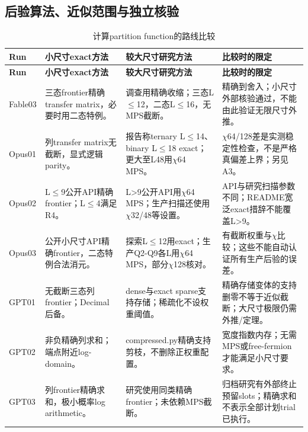 \documentclass[11pt,a4paper]{article}
\begin{document}
\subsection{后验算法、近似范围与独立核验}
{\fontsize{9.0}{12.6}\selectfont
\setlength{\tabcolsep}{2.5pt}
\begin{longtable}{>{\raggedright\arraybackslash}p{}>{\raggedright\arraybackslash}p{}>{\raggedright\arraybackslash}p{}>{\raggedright\arraybackslash}p{}}
\caption{计算partition function的路线比较}\\
\toprule
\textbf{Run} & \textbf{小尺寸exact方法} & \textbf{较大尺寸研究方法} & \textbf{比较时的限定}\tabularnewline
\midrule
\endfirsthead
\toprule
\textbf{Run} & \textbf{小尺寸exact方法} & \textbf{较大尺寸研究方法} & \textbf{比较时的限定}\tabularnewline
\midrule
\endhead
{}Fable03 & 三态frontier精确transfer matrix，必要时用二态特例。 & 调查用精确收缩；三态L\ensuremath{\leq}12，二态L\ensuremath{\leq}16，无MPS截断。 & 精确到舍入；小尺寸外部核验通过，不能由此验证无限尺寸外推。\tabularnewline
{}Opus01 & 列transfer matrix无截断，显式逻辑parity。 & 报告称ternary L\ensuremath{\leq}14、binary L\ensuremath{\leq}18 exact；更大至L48用\ensuremath{\chi}64 MPS。 & \ensuremath{\chi}64/128差是实测稳定性检查，不是严格真偏差上界；另见A3。\tabularnewline
{}Opus02 & L\ensuremath{\leq}9公开API精确frontier；L\ensuremath{\leq}4满足R4。 & L>9公开API用\ensuremath{\chi}64 MPS；生产扫描还使用\ensuremath{\chi}32/48等设置。 & API与研究扫描参数不同；README宽泛exact措辞不能覆盖L>9。\tabularnewline
{}Opus03 & 公开小尺寸API精确frontier，二态特例合法消元。 & 探索L\ensuremath{\leq}12用exact；生产Q2-Q9各L用\ensuremath{\chi}64 MPS，部分\ensuremath{\chi}128核对。 & 有截断权重与\ensuremath{\chi}比较；这些不能自动认证所有生产后验的误差。\tabularnewline
{}GPT01 & 无截断三态列frontier；Decimal后备。 & dense与exact sparse支持存储；稀疏化不设权重阈值。 & 精确存储变体的支持删零不等于近似截断；大尺寸极限仍需外推/定理。\tabularnewline
{}GPT02 & 非负精确列求和；端点附近log-domain。 & compressed.py精确支持剪枝，不删除正权重配置。 & 宽度指数内存；无需MPS或free-fermion才能满足小尺寸要求。\tabularnewline
{}GPT03 & 列frontier精确求和，极小概率log arithmetic。 & 研究使用同类精确frontier；未依赖MPS截断。 & 归档研究有外部终止预留slots；精确求和不表示全部计划trial已执行。\tabularnewline
\bottomrule
\end{longtable}
}
\end{document}
